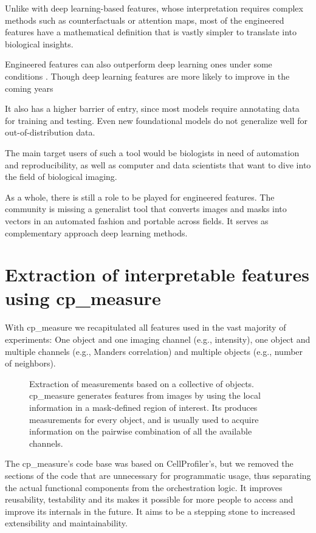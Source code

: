 \documentclass{article}
\begin{document}
Unlike with deep learning-based features, whose interpretation requires complex methods such as counterfactuals or attention maps, most of the engineered features have a mathematical definition that is vastly simpler to translate into biological insights.

Engineered features can also outperform deep learning ones under some conditions \citep{tangMorphologicalProfilingDrug2024}. Though deep learning features are more likely to improve in the coming years

It also has a higher barrier of entry, since most models require annotating data for training and testing. Even new foundational models do not generalize well for out-of-distribution data.

The main target users of such a tool would be biologists in need of automation and reproducibility, as well as computer and data scientists that want to dive into the field of biological imaging.

As a whole, there is still a role to be played for engineered features. The community is missing a generalist tool that converts images and masks into vectors in an automated fashion and portable across fields. It serves as complementary approach deep learning methods.
\section{Extraction of interpretable features using cp\_measure}
\label{sec:org5633614}
With cp\_measure we recapitulated all features used in the vast majority of experiments: One object and one imaging channel (e.g., intensity), one object and multiple channels (e.g., Manders correlation) and multiple objects (e.g., number of neighbors). 

\begin{figure}[htbp]
\centering

\caption{\label{fig:orgea7e72a}Extraction of measurements based on a collective of objects. cp\_measure generates features from images by using the local information in a mask-defined region of interest. Its produces measurements for every object, and is usually used to acquire information on the pairwise combination of all the available channels.}
\end{figure}

The cp\_measure's code base was based on CellProfiler's, but we removed the sections of the code that are unnecessary for programmatic usage, thus separating the actual functional components from the orchestration logic. It improves reusability, testability and its makes it possible for more people to access and improve its internals in the future. It aims to be a stepping stone to increased extensibility and maintainability.
\end{document}
